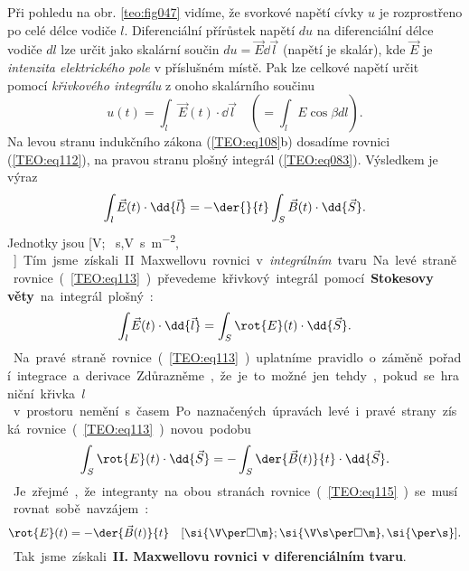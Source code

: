       Při pohledu na obr. \ref{teo:fig047} vidíme, že svorkové napětí cívky \(u\) je rozprostřeno po
      celé délce vodiče \(l\). Diferenciální přírůstek napětí \(du\) na diferenciální délce vodiče
      \(dl\) lze určit jako skalární součin \(du = \vec{E}\dd{\vec{l}}\) (napětí je skalár), kde
      \(\vec{E}\) je \emph{intenzita elektrického pole} v příslušném místě. Pak lze celkové napětí
      určit pomocí \emph{křivkového integrálu} z onoho skalárního součinu
      \begin{equation}\label{TEO:eq112}
        u(t) = \int_{l}\vec{E}(t)\cdot \dd{\vec{l}} \quad (=\int_lE\cos\beta dl).
      \end{equation}
      Na levou stranu indukčního zákona (\ref{TEO:eq108}b) dosadíme rovnici
      (\ref{TEO:eq112}), na pravou stranu plošný integrál (\ref{TEO:eq083}). Výsledkem
      je výraz
      \begin{equation}\label{TEO:eq113}
        \int_{l}\vec{E}(t)\cdot \dd{\vec{l}} = -\der{}{t}\int_{S}\vec{B}(t)\cdot \dd{\vec{S}}.
      \end{equation}
      Jednotky jsou [\si{V}; \si{\per\s},\si{\V\s\per\square\m}, \si{\m\square}]. Tím jsme získali
      II. Maxwellovu rovnici v \emph{integrálním} tvaru. Na levé straně rovnice (\ref{TEO:eq113})
      převedeme křivkový integrál pomocí \textbf{Stokesovy věty} na integrál plošný:
      \begin{equation*}
        \int_{l}\vec{E}(t)\cdot \dd{\vec{l}} = \int_{S}\rot{E}(t)\cdot \dd{\vec{S}}.
      \end{equation*}
      Na pravé straně rovnice (\ref{TEO:eq113}) uplatníme pravidlo o záměně pořadí integrace
      a derivace. Zdůrazněme, že je to možné jen tehdy, pokud se hraniční křivka \(l\) v prostoru
      nemění s časem. Po naznačených úpravách levé i pravé strany získá rovnice
      (\ref{TEO:eq113}) novou podobu
      \begin{equation}\label{TEO:eq115}
        \int_{S}\rot{E}(t)\cdot \dd{\vec{S}} = -\int_{S}\der{\vec{B}(t)}{t}\cdot \dd{\vec{S}}.
      \end{equation}
      Je zřejmé, že integranty na obou stranách rovnice (\ref{TEO:eq115}) se musí rovnat sobě
      navzájem:
      \begin{equation*}
        \rot{E}(t) = -\der{\vec{B}(t)}{t} \quad 
          [\si{\V\per\square\m}; \si{\V\s\per\square\m}, \si{\per\s}].
      \end{equation*}
      Tak jsme získali \textbf{II. Maxwellovu rovnici v diferenciálním tvaru}.
      
